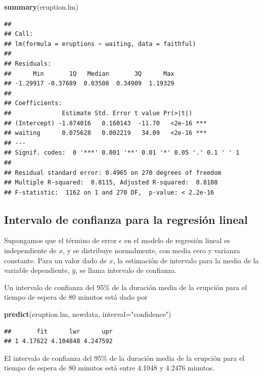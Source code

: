 \documentclass[]{article}
\newenvironment{Shaded}{\begin{snugshade}}{\end{snugshade}}
\newcommand{\KeywordTok}[1]{\textcolor[rgb]{0.13,0.29,0.53}{\textbf{{#1}}}}
\newcommand{\DataTypeTok}[1]{\textcolor[rgb]{0.13,0.29,0.53}{{#1}}}
\newcommand{\StringTok}[1]{\textcolor[rgb]{0.31,0.60,0.02}{{#1}}}
\newcommand{\NormalTok}[1]{{#1}}
\numberwithin{equation}{section}
\begin{document}
\begin{Shaded}
\begin{Highlighting}[]
\KeywordTok{summary}\NormalTok{(eruption.lm) }
\end{Highlighting}
\end{Shaded}

\begin{verbatim}
## 
## Call:
## lm(formula = eruptions ~ waiting, data = faithful)
## 
## Residuals:
##      Min       1Q   Median       3Q      Max 
## -1.29917 -0.37689  0.03508  0.34909  1.19329 
## 
## Coefficients:
##              Estimate Std. Error t value Pr(>|t|)    
## (Intercept) -1.874016   0.160143  -11.70   <2e-16 ***
## waiting      0.075628   0.002219   34.09   <2e-16 ***
## ---
## Signif. codes:  0 '***' 0.001 '**' 0.01 '*' 0.05 '.' 0.1 ' ' 1
## 
## Residual standard error: 0.4965 on 270 degrees of freedom
## Multiple R-squared:  0.8115, Adjusted R-squared:  0.8108 
## F-statistic:  1162 on 1 and 270 DF,  p-value: < 2.2e-16
\end{verbatim}

\subsection{Intervalo de confianza para la regresión
lineal}\label{intervalo-de-confianza-para-la-regresion-lineal}

Supongamos que el término de error \(\epsilon\) en el modelo de
regresión lineal es independiente de \(x\), y se distribuye normalmente,
con media cero y varianza constante. Para un valor dado de \(x\), la
estimación de intervalo para la media de la variable dependiente,
\(\bar{y}\), se llama intervalo de confianza.

Un intervalo de confianza del 95\% de la duración media de la erupción
para el tiempo de espera de 80 minutos está dado por

\begin{Shaded}
\begin{Highlighting}[]
\KeywordTok{predict}\NormalTok{(eruption.lm, newdata, }\DataTypeTok{interval=}\StringTok{"confidence"}\NormalTok{) }
\end{Highlighting}
\end{Shaded}

\begin{verbatim}
##       fit      lwr      upr
## 1 4.17622 4.104848 4.247592
\end{verbatim}

El intervalo de confianza del 95\% de la duración media de la erupción
para el tiempo de espera de 80 minutos está entre 4.1048 y 4.2476
minutos.
\end{document}
